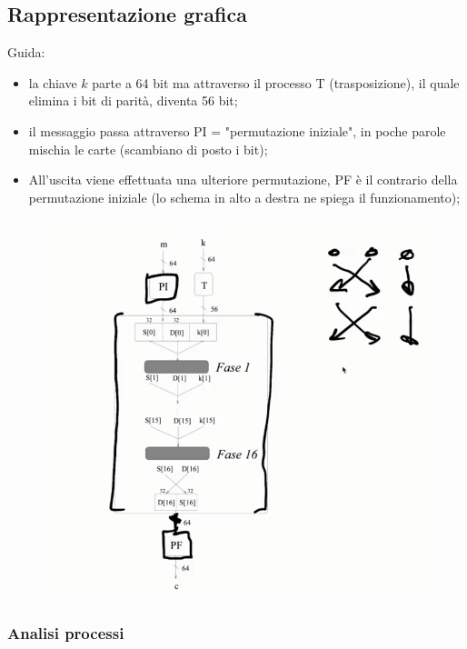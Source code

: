  \subsection{Rappresentazione grafica}
 Guida:
 \begin{itemize}
 	\item la chiave $k$ parte a 64 bit ma attraverso il processo T (trasposizione), il quale elimina i bit di parità, diventa 56 bit;
 	\item il messaggio passa attraverso PI = "permutazione iniziale", in poche parole mischia le carte (scambiano di posto i bit);
 	\item All'uscita viene effettuata una ulteriore permutazione, PF è il contrario della permutazione iniziale (lo schema in alto a destra ne spiega il funzionamento);
 \end{itemize}

\begin{figure}[htp]
	\includegraphics[width=\linewidth]{./img/DES.png}
	\label{img:DES}
\end{figure}

\subsubsection{Analisi processi}

